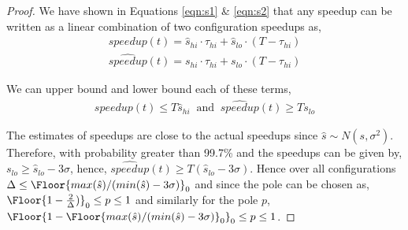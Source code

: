\begin{proof}
  We have shown in Equations \ref{eqn:s1} \& \ref{eqn:s2} that any
  speedup can be written as a linear combination of two configuration
  speedups as,
\begin{align}
speedup(t) = \hat{s}_{hi} \cdot \tau_{hi} + \hat{s}_{lo} \cdot (T - \tau_{hi})
\end{align}
\begin{align}
\widehat{speedup}(t) = s_{hi} \cdot \tau_{hi} + s_{lo} \cdot (T - \tau_{hi})
\end{align}

We can upper bound and lower bound each of these terms,
\begin{align}
speedup(t) \leq T \hat{s}_{hi} \;\; \text{and} \;\; \widehat{speedup}(t) \geq T s_{lo}
\end{align}

The estimates of speedups are close to the actual speedups since
$\hat{s} \sim N(s, \sigma^2)$. Therefore, with probability greater
than 99.7\% and the speedups can be given by, $s_{lo} \geq
\hat{s}_{lo} - 3 \sigma$, hence, $\hat{speedup}(t) \geq T
(\hat{s}_{lo} -3 \sigma)$. Hence over all configurations $\Delta \leq
\Floor{max(\hat{s})/(min(\hat{s}) - 3\sigma)}_0$ and since the pole
can be chosen as, $\Floor{1-\frac{2}{\Delta})}_0\leq p \leq 1$ and
similarly for the pole $p$, $\Floor{1-
  \Floor{max(\hat{s})/(min(\hat{s}) - 3\sigma)}_0}_0 \leq p \leq 1$.

\end{proof}
